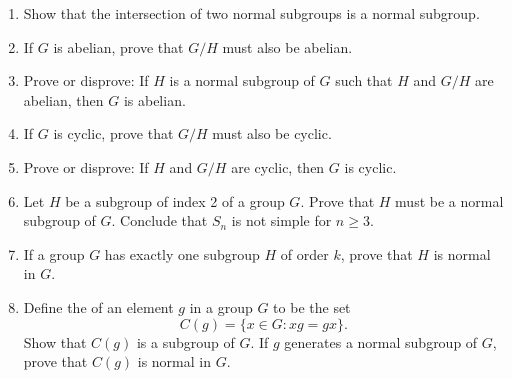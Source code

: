 {\begin{enumerate}
 
\item
Show that the intersection of two normal subgroups is a normal
subgroup. 
 
 
% 
% 
 
 

\item
If $G$ is abelian, prove that $G/H$ must also be abelian.
 
\item
Prove or disprove: If $H$ is a normal subgroup of $G$ such that $H$
and $G/H$ are abelian, then $G$ is abelian. 
 
 

\item
If $G$ is cyclic, prove that $G/H$ must also be cyclic.


\item
Prove or disprove: If $H$ and $G/H$ are cyclic, then $G$ is cyclic.
 
 
\item
Let $H$ be a subgroup of index 2 of a group $G$. Prove that $H$ must
be a normal subgroup of $G$. Conclude that $S_n$ is not simple for $n \geq 3$.

 
 

 
 
 
\item
If a group $G$ has exactly one subgroup $H$ of order $k$, prove that
$H$ is normal in $G$. 
 
 
% 
 
\item
Define the  of an element $g$ in a group $G$
to be the set  
\[
C(g) = \{ x \in G : xg = gx \}.
\]
Show that $C(g)$ is a subgroup of $G$.  If $g$ generates a normal
subgroup of $G$, prove that $C(g)$ is normal in $G$.
 

\end{enumerate}}
